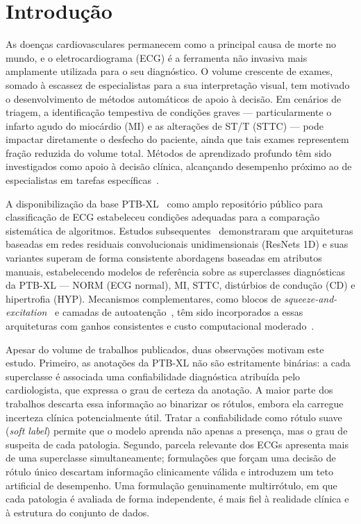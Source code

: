 \section{Introdução}
\label{sec:introducao}

As doenças cardiovasculares permanecem como a principal causa de morte no
mundo, e o eletrocardiograma (ECG) é a ferramenta não invasiva mais
amplamente utilizada para o seu diagnóstico. O volume crescente de exames,
somado à escassez de especialistas para a sua interpretação visual, tem
motivado o desenvolvimento de métodos automáticos de apoio à decisão. Em
cenários de triagem, a identificação tempestiva de condições graves ---
particularmente o infarto agudo do miocárdio (MI) e as alterações de ST/T
(STTC) --- pode impactar diretamente o desfecho do paciente, ainda que tais
exames representem fração reduzida do volume total. Métodos de aprendizado
profundo têm sido investigados como apoio à decisão clínica, alcançando
desempenho próximo ao de especialistas em tarefas
específicas~\cite{hannun2019cardiologist}.

A disponibilização da base PTB-XL~\cite{wagner2020ptbxl} como amplo
repositório público para classificação de ECG estabeleceu condições
adequadas para a comparação sistemática de algoritmos. Estudos
subsequentes~\cite{strodthoff2021benchmark} demonstraram que arquiteturas
baseadas em redes residuais convolucionais unidimensionais (ResNets 1D) e
suas variantes superam de forma consistente abordagens baseadas em
atributos manuais, estabelecendo modelos de referência sobre as
superclasses diagnósticas da PTB-XL --- NORM (ECG normal), MI, STTC,
distúrbios de condução (CD) e hipertrofia (HYP). Mecanismos complementares,
como blocos de \textit{squeeze-and-excitation}~\cite{hu2018squeeze} e
camadas de autoatenção~\cite{vaswani2017attention}, têm sido incorporados a
essas arquiteturas com ganhos consistentes e custo computacional
moderado~\cite{zhang2020seecg}.

Apesar do volume de trabalhos publicados, duas observações motivam este
estudo. Primeiro, as anotações da PTB-XL não são estritamente binárias: a
cada superclasse é associada uma confiabilidade diagnóstica atribuída pelo
cardiologista, que expressa o grau de certeza da anotação. A maior parte
dos trabalhos descarta essa informação ao binarizar os rótulos, embora ela
carregue incerteza clínica potencialmente útil. Tratar a confiabilidade
como rótulo suave (\textit{soft label}) permite que o modelo aprenda não
apenas a presença, mas o grau de suspeita de cada patologia. Segundo,
parcela relevante dos ECGs apresenta mais de uma superclasse
simultaneamente; formulações que forçam uma decisão de rótulo único
descartam informação clinicamente válida e introduzem um teto artificial de
desempenho. Uma formulação genuinamente multirrótulo, em que cada patologia
é avaliada de forma independente, é mais fiel à realidade clínica e à
estrutura do conjunto de dados.

